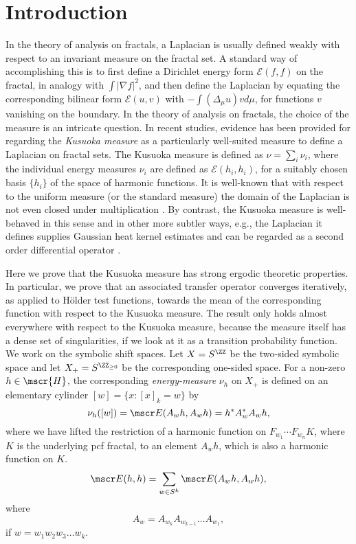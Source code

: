 \documentclass[11pt]{scrartcl}
\def\X{X}
\renewcommand{\T}{^*}
\renewcommand{\H}{\mscr{H}}
\theoremstyle{plain} %
\theoremstyle{definition}
\begin{document}
\section{Introduction}
In the theory of analysis on fractals, a Laplacian is usually defined weakly with respect to an invariant measure on the fractal set. A standard way of accomplishing this is to first define a Dirichlet energy form ${\mathcal E} (f,f)$ on the fractal, in analogy with $\int |\nabla f|^2$, and then define the Laplacian by equating the corresponding bilinear form ${\mathcal E} (u,v)$ with  $-\int \left(\Delta_{\mu}u\right)v d\mu$, for functions $v$ vanishing on the boundary. In the theory of analysis on fractals, the choice of the measure is an intricate question.
In recent studies, evidence has been provided for regarding the {\em Kusuoka measure} as a particularly well-suited measure to define a Laplacian on fractal sets. The Kusuoka measure is defined as $\nu =\sum_i \nu_i$, where the individual energy measures $\nu_i$ are defined as ${\mathcal E}(h_i, h_i)$, for a suitably chosen basis $\{h_i\}$ of the space of harmonic functions. It is well-known that with respect to the uniform measure (or the standard measure) the domain of the Laplacian is not even closed under multiplication \cite{str}. By contrast, the Kusuoka measure is well-behaved in this sense and in other more subtler ways, e.g., the Laplacian it defines supplies Gaussian heat kernel estimates and can be regarded as a second order differential operator \cite{kigami2}.

Here we prove that the Kusuoka measure has strong ergodic theoretic properties. In particular, we prove that an associated transfer operator converges iteratively, as applied to H\"older test functions, towards the mean of the corresponding function with respect to the Kusuoka measure. The result only holds almost everywhere with respect to the Kusuoka measure, because the measure itself has a dense set of singularities, if we look at it as a transition probability function. We work on the symbolic shift spaces. Let $\X=S^\ZZ$ be the two-sided symbolic space and let
$\X_+=S^{\ZZ_{\geq0}}$ be the corresponding one-sided space. For a
non-zero $h\in \H$, the corresponding \emph{energy-measure }
$\nu_h$ on $\X_+$ is defined on an elementary cylinder 
$[w]=\{x:[x]_k=w\}$ by
$$ \nu_h([w]) = \mscr E ( A_w h, A_w h) = h\T A_w\T A_w h,$$
where we have lifted the restriction of a harmonic function on $F_{w_1}\cdots F_{w_n}K$, where $K$ is the underlying pcf fractal,
to an element $A_w h$, which is also a harmonic function on $K$. 
$$ \mscr E(h,h) = \sum_{w\in S^k} \mscr E(A_w h, A_w h), $$ 
where 
$$ A_w = A_{w_k} A_{w_{k-1}} \dots A_{w_1}, $$
if $w=w_1w_2w_3\dots w_k$.
\end{document}
